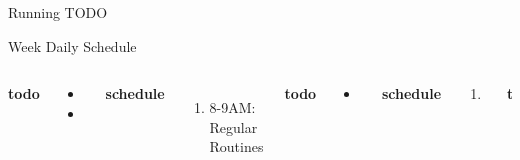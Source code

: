 \documentclass[serif, mathserif, final]{beamer}
\begin{document}
\begin{frame}{}
\begin{columns}
\begin{column}{0.50\linewidth}
\begin{block}{Running TODO}
\begin{enumerate}
{  %
  
        \end{enumerate}
      \end{block} 
      
      \begin{block}{Week Daily Schedule}
        
        \begin{columns} 
          \textbf{\small todo} \\ 
          \begin{itemize}
            \tiny \item \tiny 
          \item \tiny 
          \end{itemize} 
          \textbf{\small schedule} \\
          \begin{enumerate} 
            \tiny \item \tiny 8-9AM: Regular Routines 
          \end{enumerate} 

          \textbf{\small todo} \\
          \begin{itemize}
            \tiny \item \tiny             
          \end{itemize}  
          \textbf{\small schedule}\\ 
          \begin{enumerate} 
            \tiny \item \tiny
          \end{enumerate} 

          \textbf{\small todo} \\
          \begin{itemize}
            \tiny \item \tiny 
          \end{itemize}
          \textbf{\small schedule} \\
          \begin{enumerate}
            \tiny \item \tiny 8-9AM: Regular Routines 
            \tiny \item \tiny 9AM - 10AM: 


\end{enumerate}
\end{columns}
\end{block}
\end{column}
\end{columns}
\end{frame}
\end{document}
